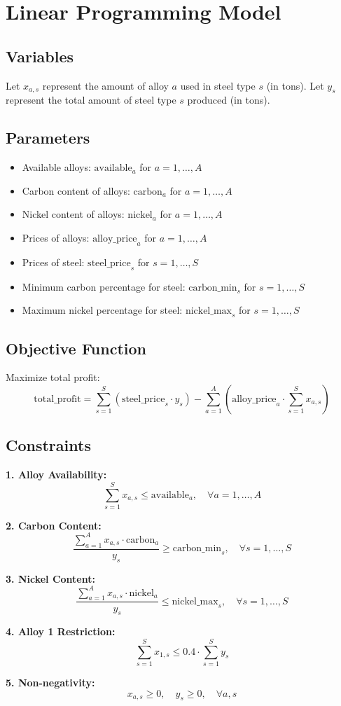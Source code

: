 \documentclass{article}
\begin{document}
\section*{Linear Programming Model}

\subsection*{Variables}
Let \( x_{a,s} \) represent the amount of alloy \( a \) used in steel type \( s \) (in tons).  
Let \( y_s \) represent the total amount of steel type \( s \) produced (in tons).

\subsection*{Parameters}
\begin{itemize}
    \item Available alloys: \( \text{available}_a \) for \( a = 1, \ldots, A \)
    \item Carbon content of alloys: \( \text{carbon}_a \) for \( a = 1, \ldots, A \)
    \item Nickel content of alloys: \( \text{nickel}_a \) for \( a = 1, \ldots, A \)
    \item Prices of alloys: \( \text{alloy\_price}_a \) for \( a = 1, \ldots, A \)
    \item Prices of steel: \( \text{steel\_price}_s \) for \( s = 1, \ldots, S \)
    \item Minimum carbon percentage for steel: \( \text{carbon\_min}_s \) for \( s = 1, \ldots, S \)
    \item Maximum nickel percentage for steel: \( \text{nickel\_max}_s \) for \( s = 1, \ldots, S \)
\end{itemize}

\subsection*{Objective Function}
Maximize total profit:
\[
\text{total\_profit} = \sum_{s=1}^{S} (\text{steel\_price}_s \cdot y_s) - \sum_{a=1}^{A} (\text{alloy\_price}_a \cdot \sum_{s=1}^{S} x_{a,s})
\]

\subsection*{Constraints}

\textbf{1. Alloy Availability:}
\[
\sum_{s=1}^{S} x_{a,s} \leq \text{available}_a, \quad \forall a = 1, \ldots, A
\]

\textbf{2. Carbon Content:}
\[
\frac{\sum_{a=1}^{A} x_{a,s} \cdot \text{carbon}_a}{y_s} \geq \text{carbon\_min}_s, \quad \forall s = 1, \ldots, S
\]

\textbf{3. Nickel Content:}
\[
\frac{\sum_{a=1}^{A} x_{a,s} \cdot \text{nickel}_a}{y_s} \leq \text{nickel\_max}_s, \quad \forall s = 1, \ldots, S
\]

\textbf{4. Alloy 1 Restriction:}
\[
\sum_{s=1}^{S} x_{1,s} \leq 0.4 \cdot \sum_{s=1}^{S} y_s
\]

\textbf{5. Non-negativity:}
\[
x_{a,s} \geq 0, \quad y_s \geq 0, \quad \forall a, s
\]
\end{document}
